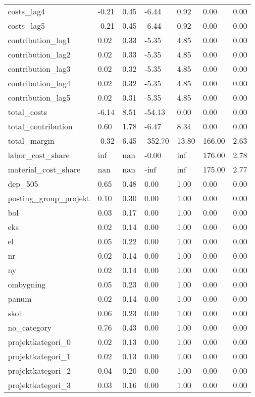 \begin{landscape}
\begin{longtable}[h!]{lllllll}
costs_lag4 & -0.21 & 0.45 & -6.44 & 0.92 & 0.00 & 0.00 \\
costs_lag5 & -0.21 & 0.45 & -6.44 & 0.92 & 0.00 & 0.00 \\
contribution_lag1 & 0.02 & 0.33 & -5.35 & 4.85 & 0.00 & 0.00 \\
contribution_lag2 & 0.02 & 0.33 & -5.35 & 4.85 & 0.00 & 0.00 \\
contribution_lag3 & 0.02 & 0.32 & -5.35 & 4.85 & 0.00 & 0.00 \\
contribution_lag4 & 0.02 & 0.32 & -5.35 & 4.85 & 0.00 & 0.00 \\
contribution_lag5 & 0.02 & 0.31 & -5.35 & 4.85 & 0.00 & 0.00 \\
total_costs & -6.14 & 8.51 & -54.13 & 0.00 & 0.00 & 0.00 \\
total_contribution & 0.60 & 1.78 & -6.47 & 8.34 & 0.00 & 0.00 \\
total_margin & -0.32 & 6.45 & -352.70 & 13.80 & 166.00 & 2.63 \\
labor_cost_share & inf & nan & -0.00 & inf & 176.00 & 2.78 \\
material_cost_share & nan & nan & -inf & inf & 175.00 & 2.77 \\
dep_505 & 0.65 & 0.48 & 0.00 & 1.00 & 0.00 & 0.00 \\
posting_group_projekt & 0.10 & 0.30 & 0.00 & 1.00 & 0.00 & 0.00 \\
bol & 0.03 & 0.17 & 0.00 & 1.00 & 0.00 & 0.00 \\
eks & 0.02 & 0.14 & 0.00 & 1.00 & 0.00 & 0.00 \\
el & 0.05 & 0.22 & 0.00 & 1.00 & 0.00 & 0.00 \\
nr & 0.02 & 0.14 & 0.00 & 1.00 & 0.00 & 0.00 \\
ny & 0.02 & 0.14 & 0.00 & 1.00 & 0.00 & 0.00 \\
ombygning & 0.05 & 0.23 & 0.00 & 1.00 & 0.00 & 0.00 \\
panum & 0.02 & 0.14 & 0.00 & 1.00 & 0.00 & 0.00 \\
skol & 0.06 & 0.23 & 0.00 & 1.00 & 0.00 & 0.00 \\
no_category & 0.76 & 0.43 & 0.00 & 1.00 & 0.00 & 0.00 \\
projektkategori_0 & 0.02 & 0.13 & 0.00 & 1.00 & 0.00 & 0.00 \\
projektkategori_1 & 0.02 & 0.13 & 0.00 & 1.00 & 0.00 & 0.00 \\
projektkategori_2 & 0.04 & 0.20 & 0.00 & 1.00 & 0.00 & 0.00 \\
projektkategori_3 & 0.03 & 0.16 & 0.00 & 1.00 & 0.00 & 0.00 \\

\end{longtable}
\end{landscape}
